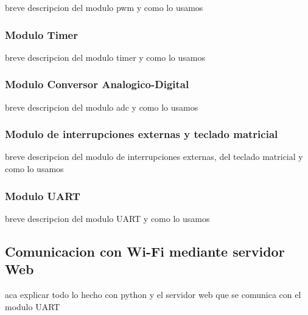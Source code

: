 \documentclass[a4paper]{article}
\begin{document}
breve descripcion del modulo pwm y como lo usamos


\subsubsection{Modulo Timer} %
\label{ssub:modulo_timer}

breve descripcion del modulo timer y como lo usamos


\subsubsection{Modulo Conversor Analogico-Digital} %
\label{ssub:modulo_conversor_analogico_digital}

breve descripcion del modulo adc y como lo usamos


\subsubsection{Modulo de interrupciones externas y teclado matricial} %
\label{ssub:modulo_de_interrupciones_externas_y_teclado_matricial}

breve descripcion del modulo de interrupciones externas, del teclado matricial y como lo usamos


\subsubsection{Modulo UART} %
\label{ssub:modulo_uart}

breve descripcion del modulo UART y como lo usamos



\subsection{Comunicacion con Wi-Fi mediante servidor Web} %
\label{sub:comunicacion_con_wi_fi_mediante_servidor_web}

aca explicar todo lo hecho con python y el servidor web que se comunica con el modulo UART
\end{document}
